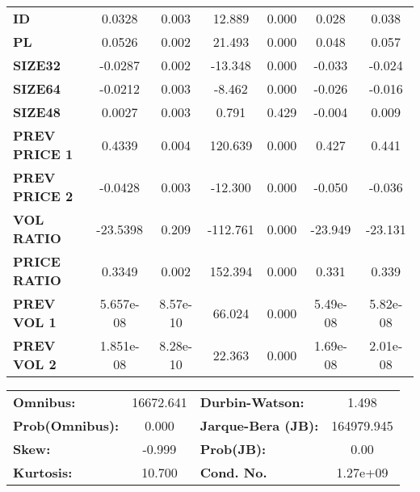 \documentclass{article}
\begin{document}
\begin{center}
\begin{tabular}{lcccccc}
\textbf{ID}    &       0.0328  &        0.003     &    12.889  &         0.000        &        0.028    &        0.038     \\
\textbf{PL}    &       0.0526  &        0.002     &    21.493  &         0.000        &        0.048    &        0.057     \\
\textbf{SIZE32}    &      -0.0287  &        0.002     &   -13.348  &         0.000        &       -0.033    &       -0.024     \\
\textbf{SIZE64}    &      -0.0212  &        0.003     &    -8.462  &         0.000        &       -0.026    &       -0.016     \\
\textbf{SIZE48}   &       0.0027  &        0.003     &     0.791  &         0.429        &       -0.004    &        0.009     \\
\textbf{PREV PRICE 1}   &       0.4339  &        0.004     &   120.639  &         0.000        &        0.427    &        0.441     \\
\textbf{PREV PRICE 2}   &      -0.0428  &        0.003     &   -12.300  &         0.000        &       -0.050    &       -0.036     \\
\textbf{VOL RATIO}   &     -23.5398  &        0.209     &  -112.761  &         0.000        &      -23.949    &      -23.131     \\
\textbf{PRICE RATIO}   &       0.3349  &        0.002     &   152.394  &         0.000        &        0.331    &        0.339     \\
\textbf{PREV VOL 1}   &    5.657e-08  &     8.57e-10     &    66.024  &         0.000        &     5.49e-08    &     5.82e-08     \\
\textbf{PREV VOL 2}   &    1.851e-08  &     8.28e-10     &    22.363  &         0.000        &     1.69e-08    &     2.01e-08     \\
\bottomrule
\end{tabular}
\begin{tabular}{lclc}
\textbf{Omnibus:}       & 16672.641 & \textbf{  Durbin-Watson:     } &     1.498   \\
\textbf{Prob(Omnibus):} &    0.000  & \textbf{  Jarque-Bera (JB):  } & 164979.945  \\
\textbf{Skew:}          &   -0.999  & \textbf{  Prob(JB):          } &      0.00   \\
\textbf{Kurtosis:}      &   10.700  & \textbf{  Cond. No.          } &  1.27e+09   \\
\bottomrule
\end{tabular}
\end{center}
\end{document}
